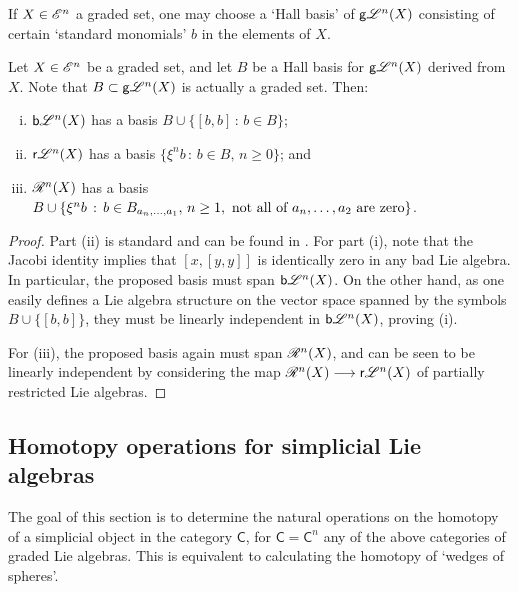 \documentclass[11pt]{article}
\newcommand{\GS}[1]{\scrE^{#1}}
\newcommand{\RestLie}[1]{\mathsf{r}{\scrL}^{#1}}%
\newcommand{\GoodLie}[1]{\mathsf{g}{\scrL}^{#1}}%
\newcommand{\BadLie}[1]{\mathsf{b}{\scrL}^{#1}}%
\newcommand{\PRLie}[1]{\scrR^{#1}}%
\newcommand{\iteratedrestn}[2]{\xi^{#2}{#1}}
\newcommand{\Fr}[1]{#1}%
\begin{document}
\begin{CategoriesOfInterest}
If $X\in\GS{n}$ a graded set, one may choose a `Hall basis' of $\Fr{\GoodLie{n}}(X)$ \cite{MR0038336} consisting of certain `standard monomials' $b$ in the elements of $X$.
\begin{prop*}
Let $X\in\GS{n}$ be a graded set, and let $B$ be a Hall basis for $\Fr{\GoodLie{n}}(X)$ derived from $X$. Note that $B\subset \Fr{\GoodLie{n}}(X)$ is actually a graded set. Then:
\begin{enumerate}[i)]\squishlist
\setlength{\parindent}{.25in}
\item $\Fr{\BadLie{n}}(X)$ has a basis $B\cup\{[b,b]\,:\,b\in B\}$;
\item $\Fr{\RestLie{n}}(X)$ has a basis $\{\iteratedrestn{b}{n}\,:\,b\in B,\,n\geq0\}$; and
\item $\Fr{\PRLie{n}}(X)$ has a basis $B\cup \{\iteratedrestn{b}{n}\,:\,b\in B_{a_{n},\ldots,a_1},\,n\geq1,\textup{ not all of $a_n,\ldots,a_2$ are zero}\}$.
\end{enumerate}
\end{prop*}
\begin{proof}
Part (ii) is standard and can be found in \cite[Proposition 14, p.66]{MR886063}.
For part (i), note that the Jacobi identity implies that $[x,[y,y]]$ is identically zero in any bad Lie algebra.
In particular, the proposed basis must span $\Fr{\BadLie{n}}(X)$. On the other hand, as one easily defines a Lie algebra structure on the vector space spanned by the symbols $B\cup\{[b,b]\}$, they must be linearly independent in $\Fr{\BadLie{n}}(X)$, proving (i).

For (iii), the proposed basis again must span $\Fr{\PRLie{n}}(X)$, and can be seen to be linearly independent by considering the map $\Fr{\PRLie{n}}(X)\to \Fr{\RestLie{n}}(X)$ of partially restricted Lie algebras.
\end{proof}


\subsection*{Homotopy operations for simplicial Lie algebras}
The goal of this section is to determine the natural operations on the homotopy of a simplicial object in the category $\mathsf{C}$, for $\mathsf{C}=\mathsf{C}^n$ any of the above categories of graded Lie algebras. This is equivalent to calculating the homotopy of `wedges of spheres'.


\end{CategoriesOfInterest}
\end{document}
